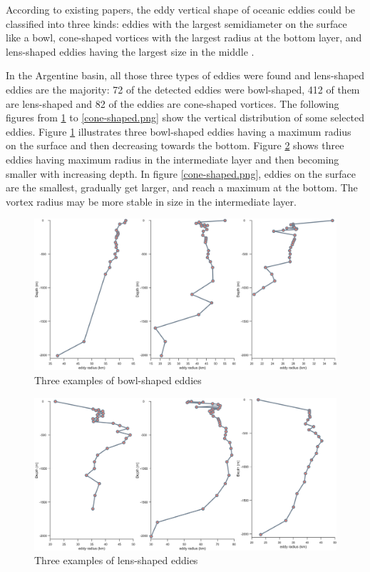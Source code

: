 According to existing papers, the eddy vertical shape of oceanic eddies could be classified into three kinds: eddies with the largest semidiameter on the surface like a bowl, cone-shaped vortices with the largest radius at the bottom layer, and lens-shaped eddies having the largest size in the middle \cite{dong2012three,lin2015three}.

In the Argentine basin, all those three types of eddies were found and lens-shaped eddies are the majority:  72 of the detected eddies were bowl-shaped, 412 of them are lens-shaped and 82 of the eddies are cone-shaped vortices. The following figures from \ref{bowl-shaped.png} to \ref{cone-shaped.png} show the vertical distribution of some selected eddies. Figure \ref{bowl-shaped.png} illustrates three bowl-shaped eddies having a maximum radius on the surface and then decreasing towards the bottom. Figure \ref{lens-shaped.png} shows three eddies having maximum radius in the intermediate layer and then becoming smaller with increasing depth. In figure \ref{cone-shaped.png}, eddies on the surface are the smallest, gradually get larger, and reach a maximum at the bottom. The vortex radius may be more stable in size in the intermediate layer.

\begin{figure}[htbp]
    \centering
    \includegraphics[width=1.0\textwidth]{chapter/figure/bowl-shaped.png}
    \caption{Three examples of bowl-shaped eddies}
    \label{bowl-shaped.png}
\end{figure}

\begin{figure}[htbp]
    \centering
    \includegraphics[width = 15cm]{chapter/figure/lens-shaped.png}
    \caption{Three examples of lens-shaped eddies }
    \label{lens-shaped.png}
\end{figure}

